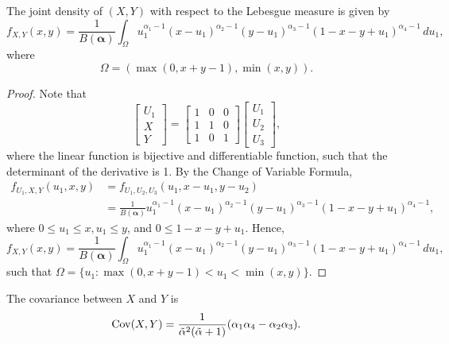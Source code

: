 \begin{proposition}
  The joint density of $(X,Y)$ with respect to the Lebesgue measure is
  given by 
  \begin{equation}
    f_{X,Y}(x,y) = \frac{1}{B(\boldsymbol{\alpha})}\int_{\Omega} u_1^{\alpha_1 - 1}(x - u_1)^{\alpha_2 -1}(y-u_1)^{\alpha_3-1}(1-x-y+u_1)^{\alpha_4-1} \, du_1,
  \end{equation}
  where 
  $$
  \Omega = (\max(0, x+y-1), \min(x,y)).
  $$
\end{proposition}

\begin{proof}
  Note that
  $$
  \begin{bmatrix}
    U_1 \\ X \\ Y
  \end{bmatrix}  = \begin{bmatrix}
    1 & 0 & 0 \\
    1 & 1 & 0 \\
    1 & 0 & 1
  \end{bmatrix}\begin{bmatrix}
    U_1 \\ U_2 \\ U_3
  \end{bmatrix}, 
  $$
  where the linear function is bijective and differentiable function, such
  that the determinant of the derivative is 1. By the Change of Variable
  Formula, 
  \begin{equation}
    \begin{split}
      f_{U_1,X,Y}(u_1,x,y) &= f_{U_1,U_2,U_3}(u_1, x - u_1, y - u_2) \\ 
      &= \frac{1}{B(\boldsymbol{\alpha})}u_1^{\alpha_1-1}(x-u_1)^{\alpha_2-1}(y-u_1 )^{\alpha_3-1}(1-x-y+u_1)^{\alpha_4-1},
    \end{split}
  \end{equation}
  where $0 \le u_1 \le x, u_1 \le y$, and $0 \le 1 - x - y + u_1$.  
  Hence,
  \begin{equation}
      \label{eq:dist-X-Y}
      f_{X,Y}(x,y) = \frac{1}{B(\boldsymbol{\alpha})}\int_{\Omega} u_1^{\alpha_1-1}(x-u_1)^{\alpha_2-1}(y-u_1)^{\alpha_3-1}(1-x-y+u_1)^{\alpha_4-1} \, du_1,
  \end{equation}
  such that $\Omega = \{u_1 : \max(0, x + y -1) < u_1 < \min(x,y)\}$.
\end{proof}

\begin{proposition}
  The covariance between $X$ and $Y$ is 
  $$\operatorname{Cov}(X,Y) = \frac{1}{\tilde{\alpha}^2(\tilde{\alpha}+1)}(\alpha_1\alpha_4 - \alpha_2\alpha_3).$$
\end{proposition}

